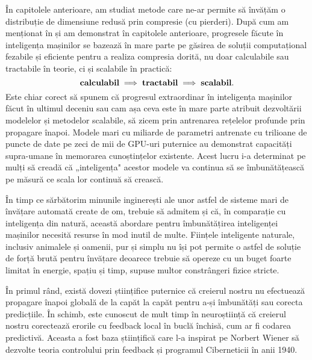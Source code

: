 \documentclass[../../book-main_ro.tex]{subfiles}
\begin{document}
În capitolele anterioare, am studiat metode care ne-ar permite să învățăm o distribuție de dimensiune redusă prin compresie (cu pierderi). După cum am menționat în  și am demonstrat în capitolele anterioare, progresele făcute în inteligența mașinilor se bazează în mare parte pe găsirea de soluții computațional fezabile și eficiente pentru a realiza compresia dorită, nu doar calculabile sau tractabile în teorie, ci și scalabile în practică:
\begin{equation}
\mbox{\textbf{calculabil}} \;
   \Longrightarrow \; \mbox{\textbf{tractabil}} \; \Longrightarrow \;
   \mbox{\textbf{scalabil}}.
\end{equation}
Este chiar corect să spunem că progresul extraordinar în inteligența mașinilor făcut în ultimul deceniu sau cam așa ceva este în mare parte atribuit dezvoltării modelelor și metodelor scalabile, să zicem prin antrenarea rețelelor profunde prin propagare înapoi. Modele mari cu miliarde de parametri antrenate cu trilioane de puncte de date pe zeci de mii de GPU-uri puternice au demonstrat capacități supra-umane în memorarea cunoștințelor existente. Acest lucru i-a determinat pe mulți să creadă că „inteligența" acestor modele va continua să se îmbunătățească pe măsură ce scala lor continuă să crească.

În timp ce sărbătorim minunile inginerești ale unor astfel de sisteme mari de învățare automată create de om, trebuie să admitem și că, în comparație cu inteligența din natură, această abordare pentru îmbunătățirea inteligenței mașinilor necesită resurse în mod inutil de multe. Ființele inteligente naturale, inclusiv animalele și oamenii, pur și simplu nu își pot permite o astfel de soluție de forță brută pentru învățare deoarece trebuie să opereze cu un buget foarte limitat în energie, spațiu și timp, supuse multor constrângeri fizice stricte.

În primul rând, există dovezi științifice puternice că creierul nostru nu efectuează propagare înapoi globală de la capăt la capăt pentru a-și îmbunătăți sau corecta predicțiile. În schimb, este cunoscut de mult timp în neuroștiință că creierul nostru corectează erorile cu feedback local în buclă închisă, cum ar fi codarea predictivă. Aceasta a fost baza științifică care l-a inspirat pe Norbert Wiener să dezvolte teoria controlului prin feedback și programul Ciberneticii în anii 1940.
\end{document}
